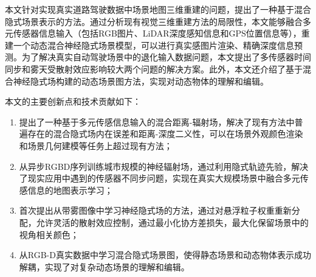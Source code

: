 %
%
%
%
%
%

\begin{conclusion}

  本文针对实现真实道路驾驶数据中场景地图三维重建的问题，提出了一种基于混合隐式场景表示的方法。通过分析现有视觉三维重建方法的局限性，本文能够融合多元传感器信息输入（包括RGB图片、LiDAR深度感知信息和GPS位置信息等），重建一个动态混合神经隐式场景模型，可以进行真实感图片渲染、精确深度信息预测。为了解决真实自动驾驶场景中的退化输入数据问题，本文提出了多传感器时间同步和雾天受散射效应影响较大两个问题的解决方案。此外，本文还介绍了基于混合神经隐式场构建的动态场景图方法，实现对动态物体的理解和编辑。

本文的主要创新点和技术贡献如下：
\begin{enumerate}
    \item 提出了一种基于多元传感信息输入的混合距离-辐射场，解决了现有方法中普遍存在的混合隐式场内在误差和距离-深度二义性，可以在场景外观颜色渲染和场景几何建模等任务上超过现有方法；
    \item 从异步RGBD序列训练城市规模的神经辐射场，通过利用隐式轨迹先验，解决了现实应用中遇到的传感器不同步问题，实现在真实大规模场景中融合多元传感信息的地图表示学习；
    \item 首次提出从带雾图像中学习神经隐式场的方法，通过对悬浮粒子权重重新分配，允许灵活的散射效应控制，通过最小化协方差损失，最大化保留场景中的视角相关颜色；
    \item 从RGB-D真实数据中学习混合隐式场景图，使得静态场景和动态物体表示成功解耦，实现了对复杂动态场景的理解和编辑。
\end{enumerate}


\end{conclusion}
